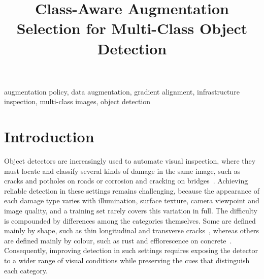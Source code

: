 \documentclass[conference]{IEEEtran}
\begin{document}
\title{Class-Aware Augmentation Selection for Multi-Class Object Detection}
\maketitle


\begin{IEEEkeywords}
augmentation policy, data augmentation, gradient alignment, infrastructure inspection, multi-class images, object detection
\end{IEEEkeywords}

\section{Introduction}
\label{sec:intro}

Object detectors are increasingly used to automate visual inspection, where they must locate and classify several kinds of damage in the same image, such as cracks and potholes on roads or corrosion and cracking on bridges~\cite{shang2024automated,zheng2024deep,vision2025inspection}. Achieving reliable detection in these settings remains challenging, because the appearance of each damage type varies with illumination, surface texture, camera viewpoint and image quality, and a training set rarely covers this variation in full. The difficulty is compounded by differences among the categories themselves. Some are defined mainly by shape, such as thin longitudinal and transverse cracks~\cite{arya2024rdd}, whereas others are defined mainly by colour, such as rust and efflorescence on concrete~\cite{flotzinger2024dacl10k}. Consequently, improving detection in such settings requires exposing the detector to a wider range of visual conditions while preserving the cues that distinguish each category.
\end{document}
